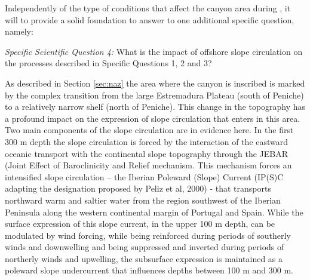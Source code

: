 \begin{description}
Independently of the type of conditions that affect the \naz canyon
area during \proje, it will to provide a solid foundation to answer to
one additional specific question, namely:

\textsl{Specific Scientific Question 4:} What is the impact of
offshore slope circulation on the processes described in Specific
Questions 1, 2 and 3?

As described in Section \ref{sec:naz} the area where the \naz canyon
is inscribed is marked by the complex transition from the large
Estremadura Plateau (south of Peniche) to a relatively narrow shelf
(north of Peniche). This change in the topography has a profound
impact on the expression of slope circulation that enters in this
area. Two main components of the slope circulation are in evidence
here. In the first 300 m depth the slope circulation is forced by the
interaction of the eastward oceanic transport with the continental
slope topography through the JEBAR (Joint Effect of Baroclinicity and
Relief \cite{huthnance84} mechanism. This mechanism forces an
intensified slope circulation -- the Iberian Poleward (Slope) Current
(IP(S)C adapting the designation proposed by Peliz et al, 2000) - that
transports northward warm and saltier water from the region southwest
of the Iberian Peninsula along the western continental margin of
Portugal and Spain. While the surface expression of this slope
current, in the upper 100 m depth, can be modulated by wind forcing,
while being reinforced during periods of southerly winds and
downwelling and being suppressed and inverted during periods of
northerly winds and upwelling, the subsurface expression is maintained
as a poleward slope undercurrent that influences depths between 100 m
and 300 m. 

\end{description}  